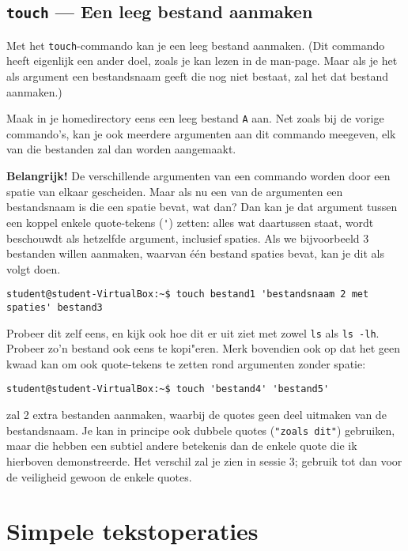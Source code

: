 \documentclass[a4paper,twoside,openany]{memoir}
\begin{document}
\section{\texttt{touch} --- Een leeg bestand aanmaken}

Met het \verb!touch!-commando kan je een leeg bestand aanmaken. (Dit commando heeft eigenlijk een ander doel, zoals je kan lezen in de man-page. Maar als je het als argument een bestandsnaam geeft die nog niet bestaat, zal het dat bestand aanmaken.)

Maak in je homedirectory eens een leeg bestand \verb!A! aan. Net zoals bij de vorige commando's, kan je ook meerdere argumenten aan dit commando meegeven, elk van die bestanden zal dan worden aangemaakt.

\textbf{Belangrijk!} De verschillende argumenten van een commando worden door een spatie van elkaar gescheiden. Maar als nu een van de argumenten een bestandsnaam is die een spatie bevat, wat dan? Dan kan je dat argument tussen een koppel enkele quote-tekens (\verb!'!) zetten: alles wat daartussen staat, wordt beschouwdt als hetzelfde argument, inclusief spaties. Als we bijvoorbeeld 3 bestanden willen aanmaken, waarvan \'e\'en bestand spaties bevat, kan je dit als volgt doen.

\begin{verbatim}
student@student-VirtualBox:~$ touch bestand1 'bestandsnaam 2 met spaties' bestand3
\end{verbatim}

Probeer dit zelf eens, en kijk ook hoe dit er uit ziet met zowel \verb!ls! als \verb!ls -lh!. Probeer zo'n bestand ook eens te kopi"eren. Merk bovendien ook op dat het geen kwaad kan om ook quote-tekens te zetten rond argumenten zonder spatie:

\begin{verbatim}
student@student-VirtualBox:~$ touch 'bestand4' 'bestand5'
\end{verbatim}

zal 2 extra bestanden aanmaken, waarbij de quotes geen deel uitmaken van de bestandsnaam. Je kan in principe ook dubbele quotes (\verb!"zoals dit"!) gebruiken, maar die hebben een subtiel andere betekenis dan de enkele quote die ik hierboven demonstreerde. Het verschil zal je zien in sessie 3; gebruik tot dan voor de veiligheid gewoon de enkele quotes.

\chapter{Simpele tekstoperaties}
\end{document}
